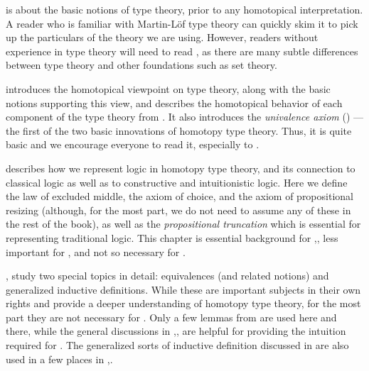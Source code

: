 \documentclass[12pt]{article}
\begin{document}
 is about the basic notions of type theory, prior to any homotopical interpretation.
A reader who is familiar with Martin-L\"of type theory can quickly skim it to pick up the particulars of the theory we are using.
However, readers without experience in type theory will need to read , as there are many subtle differences between type theory and other foundations such as set theory.

 introduces the homotopical viewpoint on type theory, along with the basic notions supporting this view, and describes the homotopical behavior of each component of the type theory from .
It also introduces the \emph{univalence axiom} () --- the first of the two basic innovations of homotopy type theory.
Thus, it is quite basic and we encourage everyone to read it, especially  to .

 describes how we represent logic in homotopy type theory, and its connection to classical logic as well as to constructive and intuitionistic logic.
Here we define the law of excluded middle, the axiom of choice, and the axiom of propositional resizing (although, for the most part, we do not need to assume any of these in the rest of the book), as well as the \emph{propositional truncation} which is essential for representing traditional logic.
This chapter is essential background for ,, less important for , and not so necessary for .

, study two special topics in detail: equivalences (and related notions) and generalized inductive definitions.
While these are important subjects in their own rights and provide a deeper understanding of homotopy type theory, for the most part they are not necessary for .
Only a few lemmas from  are used here and there, while the general discussions in ,, are helpful for providing the intuition required for .
The generalized sorts of inductive definition discussed in  are also used in a few places in ,.
\end{document}
